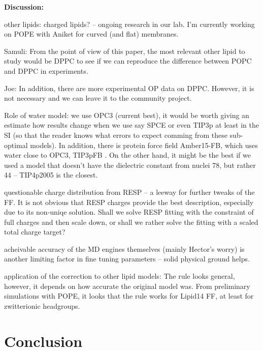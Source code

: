 \documentclass[aip,jcp,twocolumn]{revtex4}
\begin{document}
{\textbf{Discussion:}


other lipids: charged lipids? -- ongoing research in our lab.
I'm currently working on POPE with Aniket for curved (and flat) membranes. 

Samuli: From the point of view of this paper, the most relevant other lipid to study would be DPPC to see if we can reproduce the difference between POPC and DPPC in experiments.

Joe: In addition, there are more experimental OP data on DPPC. However, it is not necessary and we can leave it to the community project. 

Role of water model: we use OPC3 (current best), it would be worth giving an estimate how results change when we use say SPCE or even TIP3p at least in the SI (so that the reader knows what errors to expect comming from these sub-optimal models). 
In addition, there is protein force field Amber15-FB, which uses water close to OPC3, TIP3pFB .
On the other hand, it might be the best if we used a model that doesn't have the dielectric constant from nuclei 78, but rather 44 -- TIP4p2005 is the closest. \cite{OPC_paper, ForceBalance_paper}

questionable charge distribution from RESP -- a leeway for further tweaks of the FF.
It is not obvious that RESP charges provide the best description, especially due to its non-uniqe solution. 
Shall we solve RESP fitting with the constraint of full charges and then scale down, or shall we rather solve the fitting with a scaled total charge target?

acheivable accuracy of the MD engines themselves (mainly Hector's worry) is another limiting factor in fine tuning parameters -- solid physical ground helps.

application of the correction to other lipid models: The rule looks general, however, it depends on how accurate the original model was.
From preliminary simulations with POPE, it looks that the rule works for Lipid14 FF, at least for zwitterionic headgroups.

\section{Conclusion}

}
\end{document}
